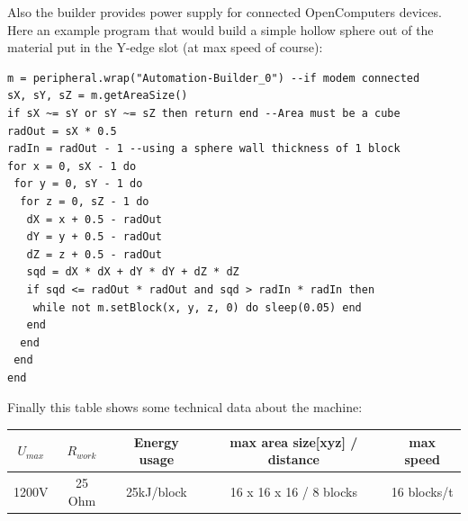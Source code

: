 \documentclass[11pt]{article} %
\begin{document}
Also the builder provides power supply for connected OpenComputers devices.\\

Here an example program that would build a simple hollow sphere out of the material put in the Y-edge slot (at max speed of course):
\begin{lstlisting}
m = peripheral.wrap("Automation-Builder_0") --if modem connected
sX, sY, sZ = m.getAreaSize()
if sX ~= sY or sY ~= sZ then return end --Area must be a cube
radOut = sX * 0.5
radIn = radOut - 1 --using a sphere wall thickness of 1 block 
for x = 0, sX - 1 do
 for y = 0, sY - 1 do
  for z = 0, sZ - 1 do
   dX = x + 0.5 - radOut
   dY = y + 0.5 - radOut
   dZ = z + 0.5 - radOut
   sqd = dX * dX + dY * dY + dZ * dZ
   if sqd <= radOut * radOut and sqd > radIn * radIn then
    while not m.setBlock(x, y, z, 0) do sleep(0.05) end
   end
  end
 end
end
\end{lstlisting}
Finally this table shows some technical data about the machine: \\
\begin{tabular}{| c | c | c | c | c |} \hline
\bf $U_{max}$ & \bf $R_{work}$ & \bf Energy usage & \bf max area size[xyz] / distance & \bf max speed \\ \hline
1200V & 25 Ohm & 25kJ/block & 16 x 16 x 16 / 8 blocks & 16 blocks/t \\ \hline
\end{tabular} \\
\end{document}
